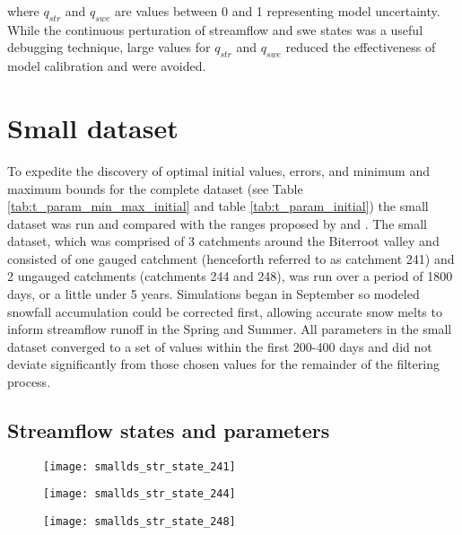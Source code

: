 where $q_{str}$ and $q_{swe}$ are values between 0 and 1 representing model uncertainty. While the continuous perturation of streamflow and swe states was a useful debugging technique, large values for $q_{str}$ and $q_{swe}$ reduced the effectiveness of model calibration and were avoided.

\section{Small dataset}

To expedite the discovery of optimal initial values, errors, and minimum and maximum bounds for the complete dataset (see Table \ref{tab:t_param_min_max_initial} and table  \ref{tab:t_param_initial}) the small dataset was run and compared with the ranges proposed by \cite{Seibert1997} and \cite{Wallner2013}.  The small dataset, which was comprised of 3 catchments around the Biterroot valley and consisted of one gauged catchment (henceforth referred to as catchment 241) and 2 ungauged catchments (catchments 244 and 248), was run over a period of 1800 days, or a little under 5 years. Simulations began in September so modeled snowfall accumulation could be corrected first, allowing accurate snow melts to inform streamflow runoff in the Spring and Summer. All parameters in the small dataset converged to a set of values within the first 200-400 days and did not deviate significantly from those chosen values for the remainder of the filtering process.

\subsection{Streamflow states and parameters}

\begin{figure}
\centering
\begin{minipage}{.33\textwidth}
  \centering
  \texttt{[image: smallds\_str\_state\_241]}
  \label{fig:241st}
\end{minipage}%
\begin{minipage}{.33\textwidth}
  \centering
  \texttt{[image: smallds\_str\_state\_244]}
  \label{fig:244st}
\end{minipage}
\begin{minipage}{.33\textwidth}
  \centering
  \texttt{[image: smallds\_str\_state\_248]}
  \label{fig:248st}
\end{minipage}
\label{fig:str_state_small}
\end{figure}

